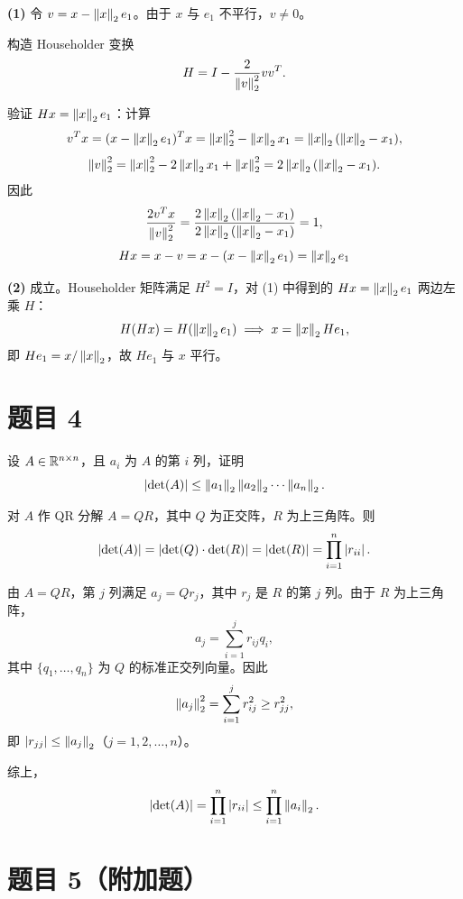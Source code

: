 \documentclass{article}
\begin{document}
\begin{solution}

  \textbf{(1)} 令 $v = x - \left\| x \right\|_2 e_1$。由于 $x$ 与 $e_1$ 不平行，$v \neq 0$。

  构造 Householder 变换
  \[
    H = I - \frac{2}{\left\| v \right\|_2^2} vv^T.
  \]

  验证 $Hx = \left\| x \right\|_2 e_1$：计算
  \[
    v^T x = (x - \left\| x \right\|_2 e_1)^T x = \left\| x \right\|_2^2 - \left\| x \right\|_2 x_1
    = \left\| x \right\|_2(\left\| x \right\|_2 - x_1),
  \]
  \[
    \left\| v \right\|_2^2 = \left\| x \right\|_2^2 - 2\left\| x \right\|_2 x_1 + \left\| x \right\|_2^2 =
    2\left\| x \right\|_2(\left\| x \right\|_2 - x_1).
  \]
  因此
  \[
    \frac{2v^T x}{\left\| v \right\|_2^2} = \frac{2\left\| x \right\|_2(\left\| x \right\|_2 -
    x_1)}{2\left\| x \right\|_2(\left\| x \right\|_2 - x_1)} = 1,
  \]
  \[
    Hx = x - v = x - (x - \left\| x \right\|_2 e_1) = \left\| x \right\|_2 e_1
  \]

  \textbf{(2)} 成立。Householder 矩阵满足 $H^2 = I$，对 (1) 中得到的 $Hx =
  \left\| x \right\|_2 e_1$ 两边左乘 $H$：
  \[
    H(Hx) = H(\left\| x \right\|_2 e_1) \implies x = \left\| x \right\|_2 He_1,
  \]
  即 $He_1 = x / \left\| x \right\|_2$，故 $He_1$ 与 $x$ 平行。

\end{solution}

\section{题目 4}

设 $A \in \mathbb{R}^{n \times n}$，且 $a_i$ 为 $A$ 的第 $i$ 列，证明
\[
  \left| \det(A) \right| \leq \left\| a_1 \right\|_2 \left\| a_2 \right\|_2 \cdots \left\| a_n \right\|_2.
\]

\begin{solution}

  对 $A$ 作 QR 分解 $A = QR$，其中 $Q$ 为正交阵，$R$ 为上三角阵。则
  \[
    \left| \det(A) \right| = \left| \det(Q) \cdot \det(R) \right| = \left| \det(R) \right| =
    \prod_{i=1}^n \left| r_{ii} \right|.
  \]

  由 $A = QR$，第 $j$ 列满足 $a_j = Q r_j$，其中 $r_j$ 是 $R$ 的第 $j$ 列。由于 $R$ 为上三角阵，
  \[
    a_j = \sum_{i=1}^{j} r_{ij} q_i,
  \]
  其中 $\{q_1, \ldots, q_n\}$ 为 $Q$ 的标准正交列向量。因此
  \[
    \left\| a_j \right\|_2^2 = \sum_{i=1}^{j} r_{ij}^2 \geq r_{jj}^2,
  \]
  即 $\left| r_{jj} \right| \leq \left\| a_j \right\|_2$（$j = 1, 2, \ldots, n$）。

  综上，
  \[
    \left| \det(A) \right| = \prod_{i=1}^n \left| r_{ii} \right| \leq \prod_{i=1}^n \left\| a_i \right\|_2.
  \]

\end{solution}

\section{题目 5（附加题）}
\end{document}
